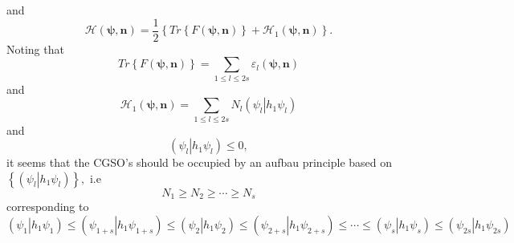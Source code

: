 \documentclass[aps,preprint]{revtex4}%
\begin{document}
and
\begin{equation}
\mathcal{H}\left(  \mathbf{\psi,n}\right)  =\frac{1}{2}\left\{  Tr\left\{
F\left(  \mathbf{\psi,n}\right)  \right\}  +\mathcal{H}_{1}\left(
\mathbf{\psi,n}\right)  \right\}  .
\end{equation}
Noting that
\begin{equation}
Tr\left\{  F\left(  \mathbf{\psi,n}\right)  \right\}  =%
{\textstyle\sum\limits_{1\leq l\leq2s}}
\varepsilon_{l}\left(  \mathbf{\psi,n}\right)
\end{equation}
and
\begin{equation}
\mathcal{H}_{1}\left(  \mathbf{\psi,n}\right)  =%
{\textstyle\sum\limits_{1\leq l\leq2s}}
N_{l}\left(  \left.  \psi_{l}\right\vert h_{1}\psi_{l}\right)
\end{equation}
and
\begin{equation}
\left(  \left.  \psi_{l}\right\vert h_{1}\psi_{l}\right)  \leq0,
\end{equation}
it seems that the CGSO's should be occupied by an aufbau principle based on
$\left\{  \left(  \left.  \psi_{l}\right\vert h_{1}\psi_{l}\right)  \right\}
,$ i.e
\begin{equation}
N_{1}\geq N_{2}\geq\cdots\geq N_{s}%
\end{equation}
corresponding to
\begin{equation}
\left(  \left.  \psi_{1}\right\vert h_{1}\psi_{1}\right)  \leq\left(  \left.
\psi_{1+s}\right\vert h_{1}\psi_{1+s}\right)  \leq\left(  \left.  \psi
_{2}\right\vert h_{1}\psi_{2}\right)  \leq\left(  \left.  \psi_{2+s}%
\right\vert h_{1}\psi_{2+s}\right)  \leq\cdots\leq\left(  \left.  \psi
_{s}\right\vert h_{1}\psi_{s}\right)  \leq\left(  \left.  \psi_{2s}\right\vert
h_{1}\psi_{2s}\right)
\end{equation}
\end{document}
